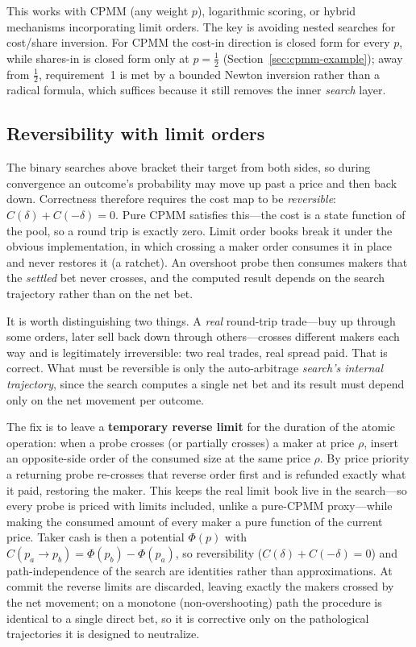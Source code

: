 \documentclass[11pt]{article}
\begin{document}
This works with CPMM (any weight $p$), logarithmic scoring, or hybrid mechanisms incorporating limit orders. The key is avoiding nested searches for cost/share inversion. For CPMM the cost-in direction is closed form for every $p$, while shares-in is closed form only at $p = \tfrac12$ (Section~\ref{sec:cpmm-example}); away from $\tfrac12$, requirement~1 is met by a bounded Newton inversion rather than a radical formula, which suffices because it still removes the inner \emph{search} layer.

\subsection{Reversibility with limit orders}

The binary searches above bracket their target from both sides, so during convergence an outcome's probability may move up past a price and then back down. Correctness therefore requires the cost map to be \emph{reversible}: $C(\delta) + C(-\delta) = 0$. Pure CPMM satisfies this---the cost is a state function of the pool, so a round trip is exactly zero. Limit order books break it under the obvious implementation, in which crossing a maker order consumes it in place and never restores it (a ratchet). An overshoot probe then consumes makers that the \emph{settled} bet never crosses, and the computed result depends on the search trajectory rather than on the net bet.

It is worth distinguishing two things. A \emph{real} round-trip trade---buy up through some orders, later sell back down through others---crosses different makers each way and is legitimately irreversible: two real trades, real spread paid. That is correct. What must be reversible is only the auto-arbitrage \emph{search's internal trajectory}, since the search computes a single net bet and its result must depend only on the net movement per outcome.

The fix is to leave a \textbf{temporary reverse limit} for the duration of the atomic operation: when a probe crosses (or partially crosses) a maker at price $\rho$, insert an opposite-side order of the consumed size at the same price $\rho$. By price priority a returning probe re-crosses that reverse order first and is refunded exactly what it paid, restoring the maker. This keeps the real limit book live in the search---so every probe is priced with limits included, unlike a pure-CPMM proxy---while making the consumed amount of every maker a pure function of the current price. Taker cash is then a potential $\Phi(p)$ with $C(p_a \to p_b) = \Phi(p_b) - \Phi(p_a)$, so reversibility ($C(\delta)+C(-\delta)=0$) and path-independence of the search are identities rather than approximations. At commit the reverse limits are discarded, leaving exactly the makers crossed by the net movement; on a monotone (non-overshooting) path the procedure is identical to a single direct bet, so it is corrective only on the pathological trajectories it is designed to neutralize.
\end{document}
